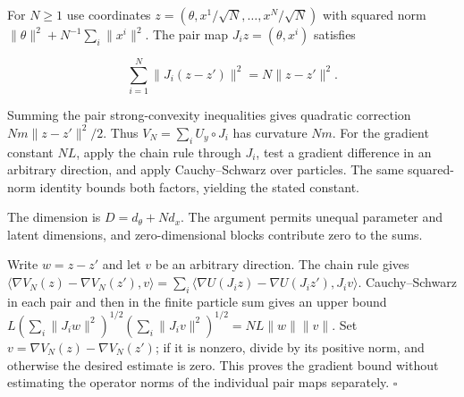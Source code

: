 \documentclass[11pt,a4paper]{article}
\begin{document}
For \(N\ge1\) use coordinates \(z=(\theta,x^1/\sqrt N,\ldots,x^N/\sqrt N)\) with squared norm \(\|\theta\|^2+N^{-1}\sum_i\|x^i\|^2\). The pair map \(J_i z=(\theta,x^i)\) satisfies

\[\sum_{i=1}^N\|J_i(z-z')\|^2=N\|z-z'\|^2.\]

Summing the pair strong-convexity inequalities gives quadratic correction \(Nm\|z-z'\|^2/2\). Thus \(V_N=\sum_iU_y\circ J_i\) has curvature \(Nm\). For the gradient constant \(NL\), apply the chain rule through \(J_i\), test a gradient difference in an arbitrary direction, and apply Cauchy–Schwarz over particles. The same squared-norm identity bounds both factors, yielding the stated constant.



The dimension is \(D=d_\theta+Nd_x\). The argument permits unequal parameter and latent dimensions, and zero-dimensional blocks contribute zero to the sums.




Write \(w=z-z'\) and let \(v\) be an arbitrary direction. The chain rule gives \(\langle\nabla V_N(z)-\nabla V_N(z'),v\rangle=\sum_i\langle\nabla U(J_i z)-\nabla U(J_i z'),J_i v\rangle\). Cauchy–Schwarz in each pair and then in the finite particle sum gives an upper bound \(L(\sum_i\|J_iw\|^2)^{1/2}(\sum_i\|J_iv\|^2)^{1/2}=NL\|w\|\|v\|\). Set \(v=\nabla V_N(z)-\nabla V_N(z')\); if it is nonzero, divide by its positive norm, and otherwise the desired estimate is zero. This proves the gradient bound without estimating the operator norms of the individual pair maps separately. \(\square\)
\end{document}
